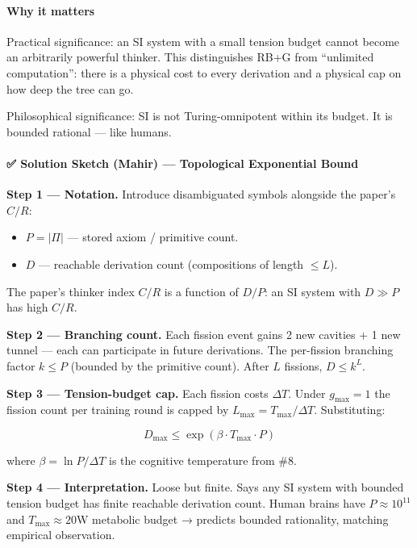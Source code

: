 \documentclass[
  11pt,
  a4paper,
]{article}
\providecommand{\tightlist}{%
  \setlength{\itemsep}{0pt}\setlength{\parskip}{0pt}}
\begin{document}
\paragraph{Why it matters}\label{why-it-matters-2}

Practical significance: an SI system with a small tension budget cannot
become an arbitrarily powerful thinker. This distinguishes RB+G from
``unlimited computation'': there is a physical cost to every derivation
and a physical cap on how deep the tree can go.

Philosophical significance: SI is not Turing-omnipotent within its
budget. It is bounded rational --- like humans.

\paragraph{✅ Solution Sketch (Mahir) --- Topological Exponential
Bound}\label{solution-sketch-mahir-topological-exponential-bound}

\textbf{Step 1 --- Notation.} Introduce disambiguated symbols alongside
the paper's \(C/R\):

\begin{itemize}
\tightlist
\item
  \(P = |\Pi|\) --- stored axiom / primitive count.
\item
  \(D\) --- reachable derivation count (compositions of length
  \(\leq L\)).
\end{itemize}

The paper's thinker index \(C/R\) is a function of \(D/P\): an SI system
with \(D \gg P\) has high \(C/R\).

\textbf{Step 2 --- Branching count.} Each fission event gains 2 new
cavities + 1 new tunnel --- each can participate in future derivations.
The per-fission branching factor \(k \leq P\) (bounded by the primitive
count). After \(L\) fissions, \(D \leq k^L\).

\textbf{Step 3 --- Tension-budget cap.} Each fission costs \(\Delta T\).
Under \(g_\text{max}=1\) the fission count per training round is capped
by \(L_\text{max} = T_\text{max}/\Delta T\). Substituting:

\[
\boxed{D_\text{max} \leq \exp\!\left(\beta \cdot T_\text{max} \cdot P\right)}
\]

where \(\beta = \ln P / \Delta T\) is the cognitive temperature from
\#8.

\textbf{Step 4 --- Interpretation.} Loose but finite. Says any SI system
with bounded tension budget has finite reachable derivation count. Human
brains have \(P \approx 10^{11}\) and \(T_\text{max} \approx 20\)W
metabolic budget → predicts bounded rationality, matching empirical
observation.
\end{document}
